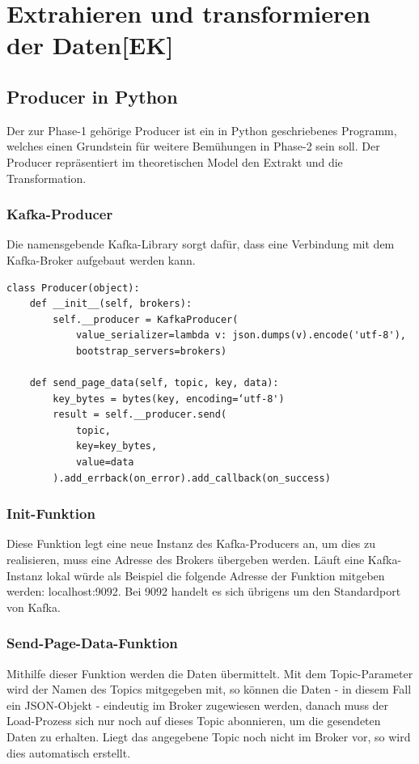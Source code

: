\newpage
\section{Extrahieren und transformieren der Daten[EK]}
\subsection{Producer in Python}
Der zur Phase-1 gehörige Producer ist ein in Python geschriebenes Programm, welches einen Grundstein für weitere Bemühungen in Phase-2 sein soll. Der Producer repräsentiert im theoretischen Model den Extrakt und die Transformation. 
\subsubsection{Kafka-Producer}
Die namensgebende Kafka-Library sorgt dafür, dass eine Verbindung mit dem Kafka-Broker aufgebaut werden kann.
\begin{lstlisting}[caption={Producer-Code}]
class Producer(object):
    def __init__(self, brokers):
        self.__producer = KafkaProducer(
            value_serializer=lambda v: json.dumps(v).encode('utf-8'),
            bootstrap_servers=brokers)

    def send_page_data(self, topic, key, data):
        key_bytes = bytes(key, encoding=‘utf-8')
        result = self.__producer.send(
            topic,
            key=key_bytes,
            value=data
        ).add_errback(on_error).add_callback(on_success)
\end{lstlisting}
\vspace{4mm}\par
\subsubsection{Init-Funktion}
Diese Funktion legt eine neue Instanz des Kafka-Producers an, um dies zu realisieren, muss eine Adresse des Brokers übergeben werden. Läuft eine Kafka-Instanz lokal würde als Beispiel die folgende Adresse der Funktion mitgeben werden: localhost:9092. Bei 9092 handelt es sich übrigens um den Standardport von Kafka.
\subsubsection{Send-Page-Data-Funktion}
Mithilfe dieser Funktion werden die Daten übermittelt. Mit dem Topic-Parameter wird der Namen des Topics mitgegeben mit, so können die Daten - in diesem Fall ein JSON-Objekt - eindeutig im Broker zugewiesen werden, danach muss der Load-Prozess sich nur noch auf dieses Topic abonnieren, um die gesendeten Daten zu erhalten. Liegt das angegebene Topic noch nicht im Broker vor, so wird dies automatisch erstellt.
